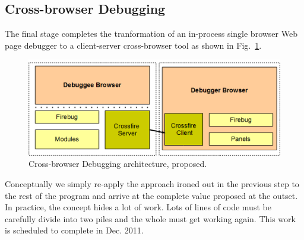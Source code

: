 \subsection{Cross-browser Debugging}
The final stage completes the tranformation of an in-process single browser Web
page debugger to a client-server cross-browser tool as shown in
Fig.~\ref{fig:crossbrowser}. \begin{figure}[htp]
  \includegraphics  [width = 86 mm] {figures/crossbrowser.png}
  \caption{Cross-browser Debugging architecture, proposed.}
 \label{fig:crossbrowser}
\end{figure}
Conceptually we simply re-apply the approach ironed out in the previous step to
the rest of the program and arrive at the complete value proposed at the outset.
In practice, the concept hides a lot of work. Lots of lines of code must be
carefully divide into two piles and the whole must get working again. This work
is scheduled to complete in Dec. 2011.






















